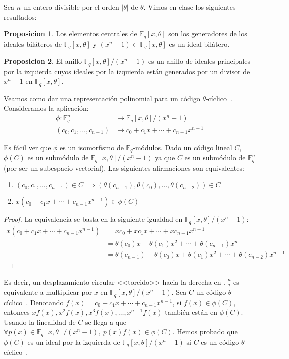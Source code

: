 \documentclass[a4paper,11pt]{article}
\numberwithin{equation}{section}
\theoremstyle{definition} %
\newtheorem{proposicion}{Proposicion}[section]
\newcommand{\Fq}{\mathbb{F}_q}
\newcommand{\Fqn}{\mathbb{F}_q^n}
\newcommand{\Fqxo}{\Fq[x, \theta]}
\newcommand{\Fxx}{\Fq[x, \theta]/(x^n - 1)}
\newcommand{\tc}{$\theta$-cíclico\ }
\begin{document}
    Sea $n$ un entero divisible por el orden $|\theta|$ de $\theta$. Vimos en clase los siguientes resultados:
    \begin{proposicion}
        Los elementos centrales de $\Fqxo$ son los generadores de los ideales biláteros de $\Fqxo$ y $(x^n - 1) \subset \Fqxo$ es un ideal bilátero.
    \end{proposicion}
    \begin{proposicion}
        El anillo $\Fxx$ es un anillo de ideales principales por la izquierda cuyos ideales por la izquierda están generados por un divisor de $x^n - 1$ en $\Fqxo$.
    \end{proposicion}

    Veamos como dar una representación polinomial para un código \tc.
    Consideramos la aplicación:
    \begin{align*}
        \phi: \Fqn &\to \Fxx \\
        (c_0, c_1, \dots, c_{n-1}) & \mapsto c_0 + c_1 x + \cdots + c_{n-1} x^{n-1}
    \end{align*}

    Es fácil ver que $\phi$ es un isomorfismo de $\Fq$-módulos. Dado un código lineal $C$, $\phi(C)$ es un submódulo de $\Fxx$ ya que $C$ es un submódulo de $\Fqn$ (por ser un subespacio vectorial). Las siguientes afirmaciones son equivalentes:
    \begin{enumerate}
        \item $(c_0, c_1, \dots, c_{n-1}) \in C \implies (\theta(c_{n-1}), \theta(c_0), \ldots, \theta(c_{n-2})) \in C$
        \item $x (c_0 + c_1 x + \cdots + c_{n-1} x^{n-1}) \in \phi(C)$
    \end{enumerate}
    \begin{proof}
        La equivalencia se basta en la siguiente igualdad en $\Fxx$:
        \begin{align*}
            x (c_0 + c_1 x + \cdots + c_{n-1} x^{n-1}) &=
                x c_0 + x c_1 x + \cdots + x c_{n-1} x^{n-1} \\
                &= \theta(c_0) x + \theta(c_1) x^2  + \cdots + \theta(c_{n-1}) x^{n} \\
                &= \theta(c_{n-1}) + \theta(c_0) x + \theta(c_1) x^2 + \cdots + \theta(c_{n-2}) x^{n-1}
        \end{align*}
    \end{proof}

    Es decir, un desplazamiento circular <<torcido>> hacia la derecha en $\Fqn$ es equivalente a multiplicar por $x$ en $\Fxx$. Sea $C$ un código \tc. Denotando $f(x) = c_0 + c_1 x + \cdots + c_{n-1} x^{n-1}$, si $f(x) \in \phi(C)$, entonces $x f(x), x^2 f(x), x^3 f(x), \dots, x^{n-1} f(x)$ también están en $\phi(C)$. Usando la linealidad de $C$ se llega a que $\forall p(x) \in \Fxx,\ p(x) f(x) \in \phi(C)$. Hemos probado que $\phi(C)$ es un ideal por la izquierda de $\Fxx$ si $C$ es un código \tc.
\end{document}
